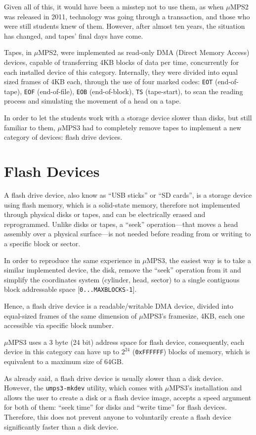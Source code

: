 \documentclass[12pt,a4paper,openright,twoside]{report}
\begin{document}
	Given all of this, it would have been a misstep not to use them, as when $\mu$MPS2 was released in 2011, technology was going through a transaction, and those who were still students knew of them. However, after almost ten years, the situation has changed, and tapes' final days have come.
  
	Tapes, in $\mu$MPS2, were implemented as read-only DMA (Direct Memory Access) devices, capable of transferring 4KB blocks of data per time, concurrently for each installed device of this category.
	Internally, they were divided into equal sized frames of 4KB each, through the use of four marked codes: \texttt{EOT} (end-of-tape), \texttt{EOF} (end-of-file), \texttt{EOB} (end-of-block), \texttt{TS} (tape-start), to scan the reading process and simulating the movement of a head on a tape.

	In order to let the students work with a storage device slower than disks, but still familiar to them, $\mu$MPS3 had to completely remove tapes to implement a new category of devices: flash drive devices.

\section{Flash Devices}
	A flash drive device, also know as ``USB sticks'' or ``SD cards'', is a storage device using flash memory, which is a solid-state memory, therefore not implemented through physical disks or tapes, and can be electrically erased and reprogrammed.
	Unlike disks or tapes, a ``seek'' operation---that moves a head assembly over a physical surface---is not needed before reading from or writing to a specific block or sector.

	In order to reproduce the same experience in $\mu$MPS3, the easiest way is to take a similar implemented device, the disk, remove the ``seek'' operation from it and simplify the coordinates system (cylinder, head, sector) to a single contiguous block addressable space [\texttt{0...MAXBLOCKS-1}].

	Hence, a flash drive device is a readable/writable DMA device, divided into equal-sized frames of the same dimension of $\mu$MPS3's framesize, 4KB, each one accessible via specific block number.

	$\mu$MPS3 uses a 3 byte (24 bit) address space for flash device, consequently, each device in this category can have up to $2^{24}$ (\texttt{0xFFFFFF}) blocks of memory, which is equivalent to a maximum size of 64GB. 

	As already said, a flash drive device is usually slower than a disk device.
	However, the \texttt{umps3-mkdev} utility, which comes with $\mu$MPS3's installation and allows the user to create a disk or a flash device image, accepts a speed argument for both of them: ``seek time'' for disks and ``write time'' for flash devices. Therefore, this does not prevent anyone to voluntarily create a flash device significantly faster than a disk device.
\end{document}
